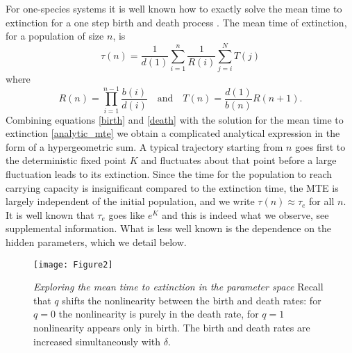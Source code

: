 For one-species systems it is well known how to exactly solve the mean time to extinction for a one step birth and death process \cite{Nisbet1982,Palamara2013}.
The mean time of extinction, for a population of size $n$, is
\begin{equation}
\tau(n) = \frac{1}{d(1)} \sum_{i=1}^n \frac{1}{R(i)} \sum_{j=i}^N T(j)
\label{analytic_mte}
\end{equation}
where
\begin{equation}
R(n) = \prod_{i=1}^{n-1} \frac{b(i)}{d(i)} \quad \textrm{and} \quad T(n) = \frac{d(1)}{b(n)}R(n+1).
\end{equation}
Combining equations \ref{birth} and \ref{death} with the solution for the mean time to extinction \ref{analytic_mte} we obtain a complicated analytical expression in the form of a hypergeometric sum.
A typical trajectory starting from $n$ goes first to the deterministic fixed point $K$ and fluctuates about that point before a large fluctuation leads to its extinction.
Since the time for the population to reach carrying capacity is insignificant compared to the extinction time, the MTE is largely independent of the initial population, and we write $\tau (n) \approx \tau_e$ for all $n$.
It is well known that $\tau_e$ goes like $e^K$ \cite{Ovaskainen2010} and this is indeed what we observe, see supplemental information.
What is less well known is the dependence on the hidden parameters, which we detail below.
\iffalse
\begin{figure}[ht!]
\centering
\texttt{[image: MTE\_vsK (4 lines at lowlow, highhigh, highlow, lowhigh]}
\begin{figure}[ht!]
\centering
\texttt{[image: MTE\_QvsD\_K100\_100]}
\caption{\emph{Lorum ipsum} So many words..} \label{otherlabel}
\end{figure}
\end{figure}
\fi
\begin{figure}[ht!]
\centering
\texttt{[image: Figure2]}
\caption{\emph{Exploring the mean time to extinction in the parameter space} Recall that $q$ shifts the nonlinearity between the birth and death rates: for $q=0$ the nonlinearity is purely in the death rate, for $q=1$ nonlinearity appears only in birth. The birth and death rates are increased simultaneously with $\delta$.} \label{mteCP}
\end{figure}

